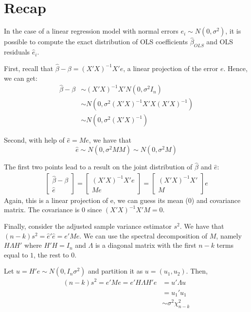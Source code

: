 \section{Recap}

In the case of a linear regression model with normal errors $e_i \sim N(0,\sigma^2)$, it is possible to compute the exact distribution of OLS coefficients $\hat\beta_{OLS}$ and OLS residuals $\hat e_i$.

First, recall that $\hat{\beta} - \beta = (X'X)^{-1}X'e$, a linear projection of the error $e$. Hence, we can get:\begin{align*}
\hat\beta - \beta & \sim (X'X)^{-1}X'N(0,\sigma^2 I_n)\\
& \sim N(0, \sigma^2 (X'X)^{-1}X'X(X'X)^{-1}) \\ & \sim N(0,\sigma^2(X'X)^{-1})
\end{align*}

Second, with help of $\hat e = Me$, we have that $$\hat e \sim N(0, \sigma^2 MM) \sim N(0, \sigma^2 M) $$

The first two points lead to a result on the joint distribution of $\hat \beta$ and $\hat e$:\begin{align*}
\begin{bmatrix}
    \hat\beta - \beta \\
    \hat e
\end{bmatrix}
= \begin{bmatrix}
    (X'X)^{-1}X'e \\
    Me
\end{bmatrix}
= \begin{bmatrix}
    (X'X)^{-1}X' \\
    M
\end{bmatrix}
e
\end{align*} Again, this is a linear projection of e, we can guess its mean (0) and covariance matrix. The covariance is 0 since $(X'X)^{-1}X'M = 0$.

Finally, consider the adjusted sample variance estimator $s^2$. We have that $(n-k)s^2 = \hat e'\hat e = e'Me$. We can use the spectral decomposition of $M$, namely $H\Lambda H'$ where $H'H=I_n$ and $\Lambda$ is a diagonal matrix with the first $n-k$ terms equal to $1$, the rest to $0$.

Let $u=H'e\sim N(0,I_n\sigma^2)$ and partition it as $u=(u_1, u_2)$. Then,\begin{align*}
(n-k)s^2 = e'Me = e'H\Lambda H'e & = u'\Lambda u \\
& = u_1'u_1 \\
& \sim \sigma^2 \chi_{n-k}^2
\end{align*}


